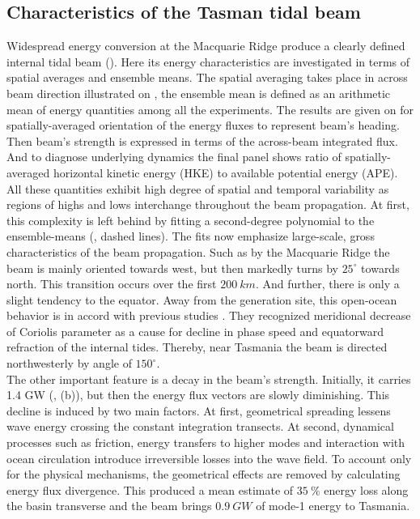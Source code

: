 \documentclass[12pt]{article}
\begin{document}
\newpage
\subsection{Characteristics of the Tasman tidal beam}
Widespread energy conversion at the Macquarie Ridge produce a clearly defined internal tidal beam 
(). Here its energy characteristics are investigated in terms of spatial 
averages and ensemble means. The spatial averaging takes place in across beam direction 
illustrated on , the ensemble mean is defined as an arithmetic mean of energy 
quantities among all the experiments. The results are given on  for 
spatially-averaged orientation of the energy fluxes to represent beam's heading. Then beam's 
strength is expressed in terms of the across-beam integrated flux. And to diagnose underlying 
dynamics the final panel shows ratio of spatially-averaged horizontal kinetic energy (HKE) to 
available potential energy (APE). All 
these quantities exhibit high degree of spatial and temporal variability as regions of 
highs and lows interchange throughout the beam propagation. At first, this complexity is left 
behind by fitting a second-degree polynomial to the ensemble-means (, 
dashed lines). The fits now emphasize large-scale, gross characteristics of the beam propagation. 
Such as by the Macquarie Ridge the beam is mainly oriented towards west, but then markedly turns by 
$25^\circ$ towards north. This transition occurs over the first $200~km$. And further, there is 
only a slight tendency to the equator. Away from the generation site, this open-ocean behavior is 
in accord with previous studies \citep{cummins2001north, rainville2006propagation, 
zhao2018satellite}. They recognized meridional decrease of Coriolis parameter as a cause for 
decline in phase speed and equatorward refraction of the internal tides. Thereby, near Tasmania the 
beam is directed northwesterly by angle of $150^\circ$.\\

The other important feature is a decay in the beam's strength. Initially, it carries 1.4 GW 
(, (b)), but then the energy flux vectors are slowly diminishing. This 
decline is induced by two main factors. At first, geometrical spreading lessens wave energy 
crossing the constant integration transects. At second, dynamical processes such as friction, 
energy transfers to higher modes and interaction with ocean circulation introduce irreversible 
losses into the wave field. To account only for the physical mechanisms, the geometrical effects 
are removed by calculating energy flux divergence. This produced a mean estimate of $35~\%$ energy 
loss along the basin transverse and the beam brings $0.9~GW$ of mode-1 energy to Tasmania.\\
\end{document}
